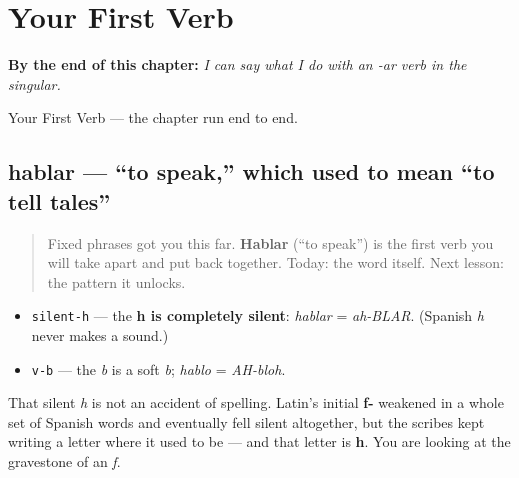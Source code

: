 
\chapter{Your First Verb}
\label{ch:first-verb}

\begin{chapteropening}
\textbf{By the end of this chapter:} \emph{I can say what I do with an -ar verb in the singular.}

Your First Verb — the chapter run end to end.
\end{chapteropening}

\section[hablar]{hablar — \textquotedblleft{}to speak,\textquotedblright{} which used to mean \textquotedblleft{}to tell tales\textquotedblright{}}

\label{lesson:ES-C06-hablar}



\begin{quote}
Fixed phrases got you this far. \textbf{Hablar} (\textquotedblleft{}to speak\textquotedblright{}) is the first verb you will take apart and put back together. Today: the word itself. Next lesson: the pattern it unlocks.
\end{quote}

\begin{sounds}
\begin{itemize}
\raggedright
  \item \texttt{silent-h} — the \textbf{h is completely silent}: \emph{hablar} = \emph{ah-BLAR}. (Spanish \emph{h} never makes a sound.)
  \item \texttt{v-b} — the \emph{b} is a soft \emph{b}; \emph{hablo} = \emph{AH-bloh}.
\end{itemize}

That silent \emph{h} is not an accident of spelling. Latin's initial \textbf{f-} weakened in a whole set of Spanish words and eventually fell silent altogether, but the scribes kept writing a letter where it used to be — and that letter is \textbf{h}. You are looking at the gravestone of an \emph{f}.
\end{sounds}

